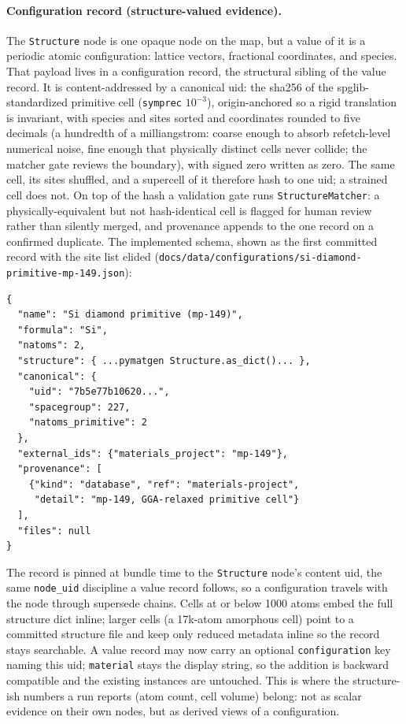 \documentclass[11pt,a4paper]{article}
\begin{document}
\paragraph{Configuration record (structure-valued evidence).} The
\texttt{Structure} node is one opaque node on the map, but a value of it is a
periodic atomic configuration: lattice vectors, fractional coordinates, and
species. That payload lives in a configuration record, the structural sibling of
the value record. It is content-addressed by a canonical uid: the sha256 of the
spglib-standardized primitive cell (\texttt{symprec} $10^{-3}$), origin-anchored
so a rigid translation is invariant, with species and sites sorted and
coordinates rounded to five decimals (a hundredth of a milliangstrom: coarse enough to absorb refetch-level numerical noise, fine enough that physically distinct cells never collide; the matcher gate reviews the boundary), with signed zero written as zero. The same cell, its sites shuffled, and a
supercell of it therefore hash to one uid; a strained cell does not. On top of
the hash a validation gate runs \texttt{StructureMatcher}: a
physically-equivalent but not hash-identical cell is flagged for human review
rather than silently merged, and provenance appends to the one record on a
confirmed duplicate. The implemented schema, shown as the first committed record
with the site list elided
(\texttt{docs/data/configurations/si-diamond-primitive-mp-149.json}):

\begin{verbatim}
{
  "name": "Si diamond primitive (mp-149)",
  "formula": "Si",
  "natoms": 2,
  "structure": { ...pymatgen Structure.as_dict()... },
  "canonical": {
    "uid": "7b5e77b10620...",
    "spacegroup": 227,
    "natoms_primitive": 2
  },
  "external_ids": {"materials_project": "mp-149"},
  "provenance": [
    {"kind": "database", "ref": "materials-project",
     "detail": "mp-149, GGA-relaxed primitive cell"}
  ],
  "files": null
}
\end{verbatim}

The record is pinned at bundle time to the \texttt{Structure} node's content uid,
the same \texttt{node\_uid} discipline a value record follows, so a configuration
travels with the node through supersede chains. Cells at or below 1000 atoms
embed the full structure dict inline; larger cells (a 17k-atom amorphous cell)
point to a committed structure file and keep only reduced metadata inline so the
record stays searchable. A value record may now carry an optional
\texttt{configuration} key naming this uid; \texttt{material} stays the display
string, so the addition is backward compatible and the existing instances are
untouched. This is where the structure-ish numbers a run reports (atom count,
cell volume) belong: not as scalar evidence on their own nodes, but as derived
views of a configuration.
\end{document}

